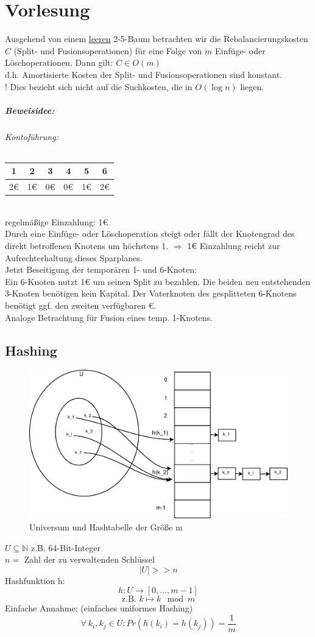 \chapter{Vorlesung}
\satz Ausgehend von einem \underline{leeren} 2-5-Baum betrachten wir die Rebalancierungskosten $C$ (Split- und Fusionsoperationen) für eine Folge von $m$ Einfüge- oder Löschoperationen. Dann gilt: $C\in O(m)$\\
d.h. Amortisierte Kosten der Split- und Fusionsoperationen sind konstant.\\
! Dies bezieht sich nicht auf die Suchkosten, die in $O(\log n)$ liegen.
\paragraph*{Beweisidee:}
\subparagraph*{Kontoführung:}
\begin{tabular}{|c|c|c|c|c|c|}
	\hline \rule[-2ex]{0pt}{5.5ex} 1 & 2 & 3 & 4 & 5 & 6 \\ 
	\hline \rule[-2ex]{0pt}{5.5ex} 2€ & 1€ & 0€ & 0€ & 1€ & 2€ \\ 
	\hline 
\end{tabular} \\
regelmäßige Einzahlung: 1€\\
Durch eine Einfüge- oder Löschoperation steigt oder fällt der Knotengrad des direkt betroffenen Knotens um höchstens 1. $\Rightarrow$ 1€ Einzahlung reicht zur Aufrechterhaltung dieses Sparplanes.\\
Jetzt Beseitigung der temporären 1- und 6-Knoten:\\
Ein 6-Knoten nutzt 1€ um seinen Split zu bezahlen. Die beiden neu entstehenden 3-Knoten benötigen kein Kapital. Der Vaterknoten des gesplitteten 6-Knotens benötigt ggf. den zweiten verfügbaren €.\\
Analoge Betrachtung für Fusion eines temp. 1-Knotens.
\section{Hashing}
\begin{figure}[h]
\centering
\caption[Universum und Hashtabelle der Größe m]{Universum und Hashtabelle der Größe m}
\label{fig:hashing}
\includegraphics[width=0.8\linewidth]{13/Grafik/hashing}
\end{figure}
$U \subseteq \mathbb{N}$ z.B. 64-Bit-Integer\\
$n=$ Zahl der zu verwaltenden Schlüssel\\
\[|U| >> n\]
Hashfunktion h:
\[h: U\rightarrow[0,\ldots,m-1]\]
\[\text{z.B. }k\mapsto k \mod m \]
Einfache Annahme: (einfaches uniformes Hashing)
\[\forall~k_i,k_j \in U : Pr(h(k_i)=h(k_j))=\frac{1}{m}   \]

